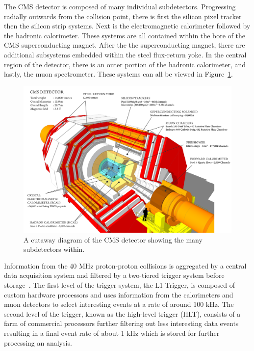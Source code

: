 The CMS detector is composed of many individual subdetectors. Progressing radially outwards from the collision point,
there is first the silicon pixel tracker then the silicon strip systems. Next is the 
electromagnetic calorimeter followed by the hadronic calorimeter. These systems are all contained
within the bore of the CMS superconducting magnet. After the the superconducting magnet, there are additional subsystems
embedded within the steel flux-return yoke. In the central region of the detector, there is an 
outer portion of the hadronic calorimeter, and lastly, the muon spectrometer. These systems can all be viewed in
Figure~\ref{fig:cms_detector}.

\begin{figure}[htbp]
\centering
     \includegraphics[width=1.0\textwidth]{cms_and_lhc/plots/cms_detector.png}
     \caption{
A cutaway diagram of the CMS detector showing the many subdetectors within.
     }
     \label{fig:cms_detector}
\end{figure}

Information from the 40 MHz proton-proton collisions is aggregated by a central data acquisition system
and filtered by a two-tiered trigger system before storage~\cite{Khachatryan:2016bia}. 
The first level of the trigger system, the L1 Trigger, is composed of custom hardware processors and uses information 
from the calorimeters and muon detectors to select interesting events at a rate of around 100 kHz. The second level of
the trigger, known as the high-level trigger (HLT), consists of a farm of commercial processors further
filtering out less interesting data events resulting in a final event rate of about 1 kHz which is stored
for further processing an analysis.



